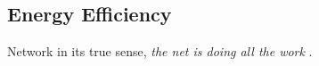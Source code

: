 \documentclass[12pt, a4paper]{article}
\begin{document}
%
%
%
%
%
%

\subsection{Energy Efficiency}

Network in its true sense, \textit{the net is doing all the work} \cite{net_doing_all_the_work}.

\cite{ahah}

\end{document}
